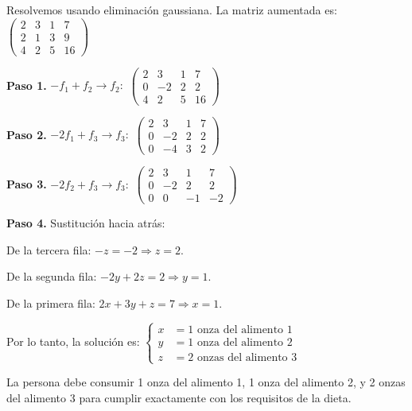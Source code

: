 \begin{prob}
\begin{myproof}
Resolvemos usando eliminación gaussiana. La matriz aumentada es: $\left(\begin{array}{ccc|c}
2 & 3 & 1 & 7 \\
2 & 1 & 3 & 9 \\
4 & 2 & 5 & 16
\end{array}\right)$

\textbf{Paso 1.} $-f_1 + f_2 \to f_2:$ $\left(\begin{array}{ccc|c}
2 & 3 & 1 & 7 \\
0 & -2 & 2 & 2 \\
4 & 2 & 5 & 16
\end{array}\right)$

\textbf{Paso 2.} $-2f_1 + f_3 \to f_3:$ $\left(\begin{array}{ccc|c}
2 & 3 & 1 & 7 \\
0 & -2 & 2 & 2 \\
0 & -4 & 3 & 2
\end{array}\right)$

\textbf{Paso 3.} $-2f_2 + f_3 \to f_3:$ $\left(\begin{array}{ccc|c}
2 & 3 & 1 & 7 \\
0 & -2 & 2 & 2 \\
0 & 0 & -1 & -2
\end{array}\right)$

\textbf{Paso 4.} Sustitución hacia atrás:

De la tercera fila: $-z = -2\Rightarrow z = 2.$

De la segunda fila: $-2y + 2z = 2\Rightarrow y = 1.$

De la primera fila: $2x + 3y + z = 7\Rightarrow x = 1.$

Por lo tanto, la solución es:
$\begin{cases}
x &= 1 \text{ onza del alimento 1}\\
y &= 1 \text{ onza del alimento 2}\\
z &= 2 \text{ onzas del alimento 3}
\end{cases}$

La persona debe consumir 1 onza del alimento 1, 1 onza del alimento 2, y 2 onzas del alimento 3 para cumplir exactamente con los requisitos de la dieta.
\end{myproof}
\end{prob}

